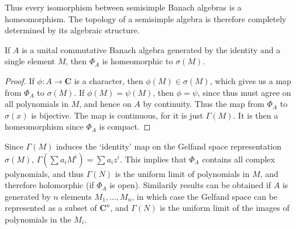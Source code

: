 Thus every isomorphism between semisimple Banach algebras is a homeomorphism. The topology of a semisimple algebra is therefore completely determined by its algebraic structure.

\begin{theorem}
    If $A$ is a unital commutative Banach algebra generated by the identity and a single element $M$, then $\Phi_A$ is homeomorphic to $\sigma(M)$.
\end{theorem}
\begin{proof}
    If $\phi: A \to \mathbf{C}$ is a character, then $\phi(M) \in \sigma(M)$, which gives us a map from $\Phi_A$ to $\sigma(M)$. If $\phi(M) = \psi(M)$, then $\phi = \psi$, since thus must agree on all polynomials in $M$, and hence on $A$ by continuity. Thus the map from $\Phi_A$ to $\sigma(x)$ is bijective. The map is continuous, for it is just $\Gamma(M)$. It is then a homeomorphism since $\Phi_A$ is compact.
\end{proof}

Since $\Gamma(M)$ induces the `identity' map on the Gelfand space representation $\sigma(M)$, $\Gamma(\sum a_i M^i) = \sum a_i z^i$. This implies that $\Phi_A$ contains all complex polynomials, and thus $\Gamma(N)$ is the uniform limit of polynomials in $M$, and therefore holomorphic (if $\Phi_A$ is open). Similarily results can be obtained if $A$ is generated by $n$ elements $M_1, \dots, M_n$, in which case the Gelfand space can be represented as a subset of $\mathbf{C}^n$, and $\Gamma(N)$ is the uniform limit of the images of polynomials in the $M_i$.

